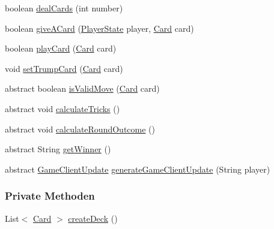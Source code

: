 \begin{DoxyCompactItemize}
\item 
boolean \hyperlink{a00068_acdff77c9c369980f9bab1540f58c4393}{deal\-Cards} (int number)
\item 
boolean \hyperlink{a00068_ae9373e9985f6fad3724988fb885e367e}{give\-A\-Card} (\hyperlink{a00065}{Player\-State} player, \hyperlink{a00054}{Card} card)
\item 
boolean \hyperlink{a00068_aaf941aefdd9c544e246c4f0cdcdb68ec}{play\-Card} (\hyperlink{a00054}{Card} card)
\item 
void \hyperlink{a00068_a42762b25f6822adfa7e66930d03f0f49}{set\-Trump\-Card} (\hyperlink{a00054}{Card} card)
\item 
abstract boolean \hyperlink{a00068_a48cc9b97dd2832c14668fac3a6f5be1a}{is\-Valid\-Move} (\hyperlink{a00054}{Card} card)
\item 
\hypertarget{a00068_a7d84af2a204ece4803fff0e6b96b3bcf}{abstract void \hyperlink{a00068_a7d84af2a204ece4803fff0e6b96b3bcf}{calculate\-Tricks} ()}\label{a00068_a7d84af2a204ece4803fff0e6b96b3bcf}

\item 
\hypertarget{a00068_a8f483f68c9fdb7b61b2ba18d55ab1675}{abstract void \hyperlink{a00068_a8f483f68c9fdb7b61b2ba18d55ab1675}{calculate\-Round\-Outcome} ()}\label{a00068_a8f483f68c9fdb7b61b2ba18d55ab1675}

\item 
\hypertarget{a00068_a09bda53ef3724db4a9a18fc0399d21b2}{abstract String \hyperlink{a00068_a09bda53ef3724db4a9a18fc0399d21b2}{get\-Winner} ()}\label{a00068_a09bda53ef3724db4a9a18fc0399d21b2}

\item 
abstract \hyperlink{a00059}{Game\-Client\-Update} \hyperlink{a00068_a4bc36d254178bf54e75fcdf472a5f863}{generate\-Game\-Client\-Update} (String player)
\end{DoxyCompactItemize}
\subsubsection*{Private Methoden}
\begin{DoxyCompactItemize}
\item 
List$<$ \hyperlink{a00054}{Card} $>$ \hyperlink{a00068_a876cfc6ed92d4657b0b9670c7556747b}{create\-Deck} ()
\end{DoxyCompactItemize}
